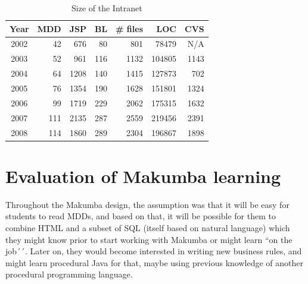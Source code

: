 \documentclass{chi2009}
\begin{document}
\begin{table}[t]
	\centering
	\begin{tabular}{c|r|r|r|r|r|r}
		\hline
		\hline
		Year	& MDD	& JSP	& BL	& \# files	& LOC		& CVS	 \\
		\hline
		\hline
		2002 	& 42	& 676	& 80	& 801		& 78479 	& N/A	 \\ 
		\hline
		2003 	& 52	& 961	& 116	& 1132		& 104805 	& 1143	 \\ 
		\hline
		2004 	& 64	& 1208	& 140	& 1415		& 127873 	& 702	 \\ 
		\hline
		2005 	& 76	& 1354	& 190	& 1628		& 151801 	& 1324	 \\ 
		\hline
		2006 	& 99	& 1719	& 229	& 2062		& 175315 	& 1632	 \\ 
		\hline
		2007 	& 111	& 2135	& 287	& 2559		& 219456 	& 2391	 \\ 
		\hline
		2008 	& 114	& 1860	& 289	& 2304		& 196867 	& 1898	 \\ 
		\hline
		
		\hline
		\hline
	\end{tabular}
	\caption{Size of the Intranet}
	\label{tab:intranet-size}
\end{table} 

\section{Evaluation of Makumba learning}\label{sec:techCommittee}
Throughout the Makumba design, the assumption was that it will be easy for students to read MDDs, and based on that, it will be possible for them to combine HTML and a subset of SQL (itself based on natural language) which they might know prior to start working with Makumba or might learn ``on the job´´. Later on, they would become interested in writing new business rules, and might learn procedural Java for that, maybe using previous knowledge of another procedural programming language. %
\end{document}
